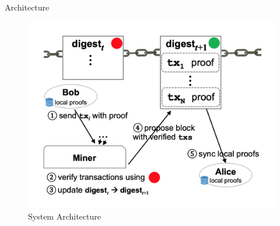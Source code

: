 \documentclass[biblatex,aspectratio=169,11pt]{mybeamer}
\begin{document}
\begin{frame}{Architecture}
  \begin{figure}
    \includegraphics[width=0.6\linewidth]{figs/Edrax-arch.png}
    \caption{System Architecture}
  \end{figure}
\end{frame}

\subsection{}
\end{document}
